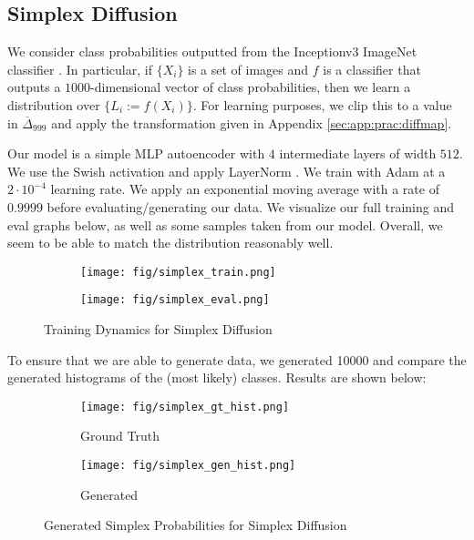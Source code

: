 \documentclass{article}
\theoremstyle{plain}
\theoremstyle{definition}
\theoremstyle{remark}
\begin{document}
\subsection{Simplex Diffusion}\label{sec:app:experiment:simplex}

We consider class probabilities outputted from the Inceptionv3 ImageNet classifier \citep{Szegedy2015RethinkingTI}. In particular, if $\{X_i\}$ is a set of images and $f$ is a classifier that outputs a $1000$-dimensional vector of class probabilities, then we learn a distribution over $\{L_i := f(X_i)\}$. For learning purposes, we clip this to a value in $\overline{\Delta}_{999}$ and apply the transformation given in Appendix \ref{sec:app:prac:diffmap}.

Our model is a simple MLP autoencoder with $4$ intermediate layers of width $512$. We use the Swish activation \citep{Ramachandran2017SwishAS} and apply LayerNorm \citep{Ba2016LayerN}. We train with Adam \citep{Kingma2014AdamAM} at a $2 \cdot 10^{-4}$ learning rate. We apply an exponential moving average with a rate of $0.9999$ before evaluating/generating our data. We visualize our full training and eval graphs below, as well as some samples taken from our model. Overall, we seem to be able to match the distribution reasonably well.
\begin{figure}[H]
    \centering
    \begin{subfigure}[b]{0.48\textwidth}
        \texttt{[image: fig/simplex\_train.png]}
    \end{subfigure}
    \hfill
    \begin{subfigure}[b]{0.48\textwidth}
        \texttt{[image: fig/simplex\_eval.png]}
    \end{subfigure}
    \caption{Training Dynamics for Simplex Diffusion}
\end{figure}
To ensure that we are able to generate data, we generated 10000 and compare the generated histograms of the (most likely) classes. Results are shown below:
\begin{figure}[H]
    \centering
    \begin{subfigure}[b]{0.48\textwidth}
        \texttt{[image: fig/simplex\_gt\_hist.png]}
        \caption{Ground Truth}
    \end{subfigure}
    \hfill
    \begin{subfigure}[b]{0.48\textwidth}
        \texttt{[image: fig/simplex\_gen\_hist.png]}
        \caption{Generated}
    \end{subfigure}
    \caption{Generated Simplex Probabilities for Simplex Diffusion}
\end{figure}
\end{document}
